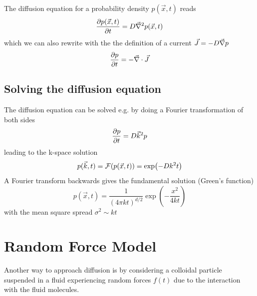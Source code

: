 \documentclass{/home/ben/Templates/notebook}
\begin{document}
	\newpage
	\begin{theorem}
		The diffusion equation for a probability density $p(\vec{x}, t)$ reads
		\begin{equation}
		\pdv{p(\vec{x}, t)}{t} = D \vec{\nabla}^2 p(\vec{x}, t)
		\end{equation}
		which we can also rewrite with the the definition of a current $\vec{J} = -D \vec{\nabla} p$
		\begin{equation}
		\pdv{p}{t} = - \vec{\nabla} \cdot \vec{J}
		\end{equation}
	\end{theorem}
	
	\subsection*{Solving the diffusion equation}
	
	The diffusion equation can be solved e.g. by doing a Fourier transformation of both sides
	\begin{equation}
	\pdv{p}{t} =  D \vec{k}^2 p
	\end{equation}
	leading to the k-space solution
	\begin{equation}
	p(\vec{k},t) = \mathcal{F}(p(\vec{x},t)) = \exp(-D k^2 t)
	\end{equation}
	A Fourier transform backwards gives the fundamental solution (Green's function)
	\begin{equation}
	p(\vec{x},t) = \frac{1}{(4 \pi k t)^{d/2}} \exp(-\frac{x^2}{4 k t})
	\end{equation}
	with the mean square spread $\sigma^2 \sim k t$
	
	\newpage
	\section{Random Force Model}
	
	Another way to approach diffusion is by considering a colloidal particle suspended in a fluid experiencing random forces $f(t)$ due to the interaction with the fluid molecules. 
	
\end{document}
